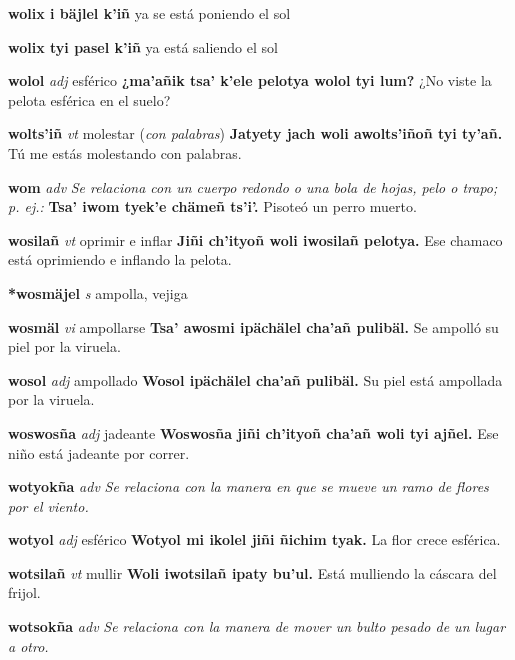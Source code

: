 \documentclass[10pt]{scrbook}
\newcommand{\entry}[1]{\textbf{#1}}
\newcommand{\nontranslationdef}[1]{\textit{#1}}
\newcommand{\partofspeech}[1]{\textit{#1}}
\newcommand{\spanishtranslation}[1]{#1}
\newcommand{\clarification}[1]{(\textit{#1})}
\newcommand{\cholexample}[1]{\textbf{#1}}
\newcommand{\exampletranslation}[1]{#1}
\begin{document}
\begin{multicols}{2}
\entry{wolix i bäjlel k'iñ}
\spanishtranslation{ya se está poniendo el sol}

\entry{wolix tyi pasel k'iñ}
\spanishtranslation{ya está saliendo el sol}

\entry{wolol}
\partofspeech{adj}
\spanishtranslation{esférico}
\cholexample{¿ma'añik tsa' k'ele pelotya wolol tyi lum?}
\exampletranslation{¿No viste la pelota esférica en el suelo?}

\entry{wolts'iñ}
\partofspeech{vt}
\spanishtranslation{molestar}
\clarification{con palabras}
\cholexample{Jatyety jach woli awolts'iñoñ tyi ty'añ.}
\exampletranslation{Tú me estás molestando con palabras.}

\entry{wom}
\partofspeech{adv}
\nontranslationdef{Se relaciona con un cuerpo redondo o una bola de hojas, pelo o trapo; p. ej.:}
\cholexample{Tsa' iwom tyek'e chämeñ ts'i'.}
\exampletranslation{Pisoteó un perro muerto.}

\entry{wosilañ}
\partofspeech{vt}
\spanishtranslation{oprimir e inflar}
\cholexample{Jiñi ch'ityoñ woli iwosilañ pelotya.}
\exampletranslation{Ese chamaco está oprimiendo e inflando la pelota.}

\entry{*wosmäjel}
\partofspeech{s}
\spanishtranslation{ampolla, vejiga}

\entry{wosmäl}
\partofspeech{vi}
\spanishtranslation{ampollarse}
\cholexample{Tsa' awosmi ipächälel cha'añ pulibäl.}
\exampletranslation{Se ampolló su piel por la viruela.}

\entry{wosol}
\partofspeech{adj}
\spanishtranslation{ampollado}
\cholexample{Wosol ipächälel cha'añ pulibäl.}
\exampletranslation{Su piel está ampollada por la viruela.}

\entry{woswosña}
\partofspeech{adj}
\spanishtranslation{jadeante}
\cholexample{Woswosña jiñi ch'ityoñ cha'añ woli tyi ajñel.}
\exampletranslation{Ese niño está jadeante por correr.}

\entry{wotyokña}
\partofspeech{adv}
\nontranslationdef{Se relaciona con la manera en que se mueve un ramo de flores por el viento.}

\entry{wotyol}
\partofspeech{adj}
\spanishtranslation{esférico}
\cholexample{Wotyol mi ikolel jiñi ñichim tyak.}
\exampletranslation{La flor crece esférica.}

\entry{wotsilañ}
\partofspeech{vt}
\spanishtranslation{mullir}
\cholexample{Woli iwotsilañ ipaty bu'ul.}
\exampletranslation{Está mulliendo la cáscara del frijol.}

\entry{wotsokña}
\partofspeech{adv}
\nontranslationdef{Se relaciona con la manera de mover un bulto pesado de un lugar a otro.}


\end{multicols}
\end{document}
